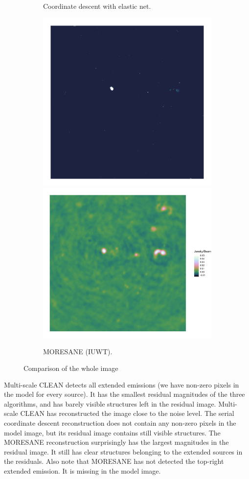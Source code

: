 \begin{figure}[!htp]
\begin{subfigure}[b]{0.98\linewidth}
		\caption{Coordinate descent with elastic net.}
		\label{results:comp:clean}
	\end{subfigure}
	\begin{subfigure}[b]{0.98\linewidth}
		\centering
		\includegraphics[width=0.412\linewidth, clip, trim={0.72in 0.72in 0.72in 0.72in}]{./chapters/10.results/iuwt/iuwt-model.png}
		\includegraphics[width=0.490\linewidth, clip, trim={0.36in 0.36in 0.0in 0.36in}]{./chapters/10.results/iuwt/iuwt-residuals.png}
		\caption{MORESANE (IUWT).}
		\label{results:comp:clean}
	\end{subfigure}

	\caption{Comparison of the whole image}
	\label{results:cleancomp:figure}
\end{figure}

\newpage

Multi-scale CLEAN detects all extended emissions (we have non-zero pixels in the model for every source). It has the smallest residual magnitudes of the three algorithms, and has barely visible structures left in the residual image. Multi-scale CLEAN has reconstructed the image close to the noise level. The serial coordinate descent reconstruction does not contain any non-zero pixels in the model image, but its residual image contains still visible structures. The MORESANE reconstruction surprisingly has the largest magnitudes in the residual image. It still has clear structures belonging to the extended sources in the residuals. Also note that MORESANE has not detected the top-right extended emission. It is missing in the model image.

